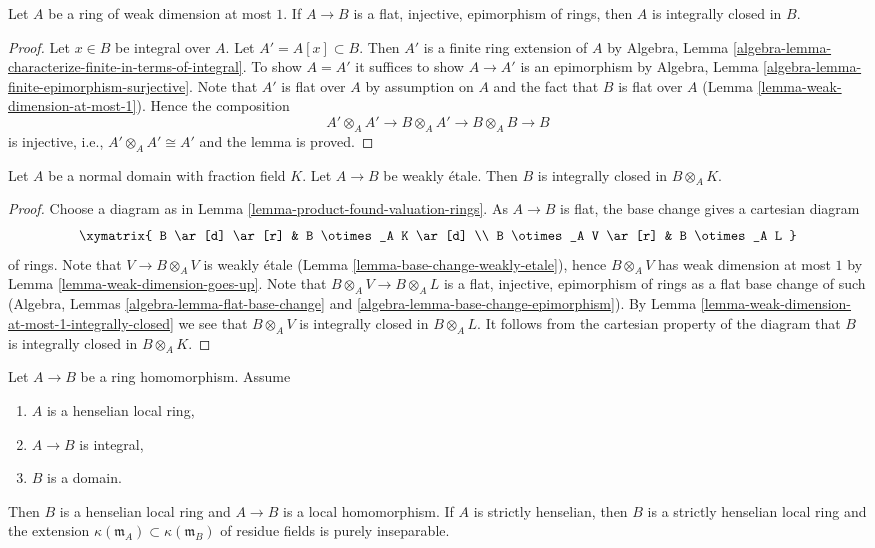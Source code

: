 \begin{lemma}
\label{lemma-weak-dimension-at-most-1-integrally-closed}
Let $A$ be a ring of weak dimension at most $1$.
If $A \to B$ is a flat, injective, epimorphism of rings, then
$A$ is integrally closed in $B$.
\end{lemma}

\begin{proof}
Let $x \in B$ be integral over $A$. Let $A' = A[x] \subset B$.
Then $A'$ is a finite ring extension of $A$ by
Algebra, Lemma \ref{algebra-lemma-characterize-finite-in-terms-of-integral}.
To show $A = A'$ it suffices to show $A \to A'$ is an epimorphism by
Algebra, Lemma \ref{algebra-lemma-finite-epimorphism-surjective}.
Note that $A'$ is flat over $A$ by assumption on $A$ and the fact that
$B$ is flat over $A$ (Lemma \ref{lemma-weak-dimension-at-most-1}).
Hence the composition
$$
A' \otimes_A A' \to B \otimes_A A' \to B \otimes_A B \to B
$$
is injective, i.e., $A' \otimes_A A' \cong A'$ and the lemma is proved.
\end{proof}

\begin{lemma}
\label{lemma-normality-goes-up}
Let $A$ be a normal domain with fraction field $K$.
Let $A \to B$ be weakly \'etale. Then
$B$ is integrally closed in $B \otimes_A K$.
\end{lemma}

\begin{proof}
Choose a diagram as in Lemma \ref{lemma-product-found-valuation-rings}.
As $A \to B$ is flat, the base change gives a cartesian diagram
$$
\xymatrix{
B \ar[d] \ar[r] & B \otimes_A K \ar[d] \\
B \otimes_A V \ar[r] & B \otimes_A L
}
$$
of rings. Note that $V \to B \otimes_A V$ is weakly \'etale
(Lemma \ref{lemma-base-change-weakly-etale}), hence $B \otimes_A V$
has weak dimension at most $1$ by Lemma \ref{lemma-weak-dimension-goes-up}.
Note that $B \otimes_A V \to B \otimes_A L$ is a flat, injective,
epimorphism of rings as a flat base change of such
(Algebra, Lemmas \ref{algebra-lemma-flat-base-change} and
\ref{algebra-lemma-base-change-epimorphism}).
By Lemma \ref{lemma-weak-dimension-at-most-1-integrally-closed}
we see that $B \otimes_A V$ is integrally closed in $B \otimes_A L$.
It follows from the cartesian property of the diagram
that $B$ is integrally closed in $B \otimes_A K$.
\end{proof}

\begin{lemma}
\label{lemma-integral-over-henselian}
Let $A \to B$ be a ring homomorphism.
Assume
\begin{enumerate}
\item $A$ is a henselian local ring,
\item $A \to B$ is integral,
\item $B$ is a domain.
\end{enumerate}
Then $B$ is a henselian local ring and $A \to B$ is a local homomorphism.
If $A$ is strictly henselian, then $B$ is a strictly henselian local ring
and the extension $\kappa(\mathfrak m_A) \subset \kappa(\mathfrak m_B)$
of residue fields is purely inseparable.
\end{lemma}

